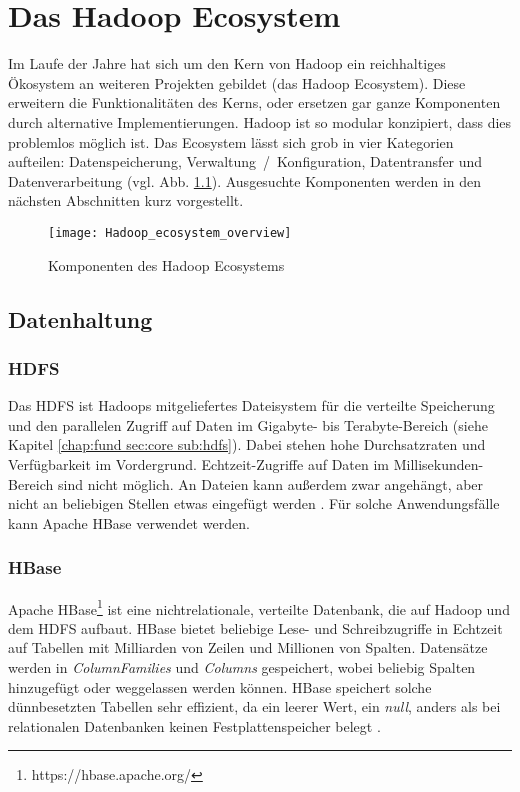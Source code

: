 \chapter{Das Hadoop Ecosystem}
Im Laufe der Jahre hat sich um den Kern von Hadoop ein reichhaltiges Ökosystem an weiteren Projekten gebildet (das Hadoop Ecosystem). Diese erweitern die Funktionalitäten des Kerns, oder ersetzen gar ganze Komponenten durch alternative Implementierungen. Hadoop ist so modular konzipiert, dass dies problemlos möglich ist. Das Ecosystem lässt sich grob in vier Kategorien aufteilen: Datenspeicherung, Verwaltung~/~Konfiguration, Datentransfer und Datenverarbeitung (vgl. Abb. \ref{fig:ecosys}). Ausgesuchte Komponenten werden in den nächsten Abschnitten kurz vorgestellt.

\begin{figure}[ht]
    \centering
    \texttt{[image: Hadoop\_ecosystem\_overview]}
    \caption[Komponenten des Hadoop Ecosystems]{Komponenten des Hadoop Ecosystems\parencite{van_der_weel_hadoop_2015}}
    \label{fig:ecosys}
\end{figure}

\section{Datenhaltung}
\subsection{HDFS}
Das HDFS ist Hadoops mitgeliefertes Dateisystem für die verteilte Speicherung und den parallelen Zugriff auf Daten im Gigabyte- bis Terabyte-Bereich (siehe Kapitel \ref{chap:fund sec:core sub:hdfs}). Dabei stehen hohe Durchsatzraten und Verfügbarkeit im Vordergrund. Echtzeit-Zugriffe auf Daten im Millisekunden-Bereich sind nicht möglich. An Dateien kann außerdem zwar angehängt, aber nicht an beliebigen Stellen etwas eingefügt werden \parencite[vgl.][Kapitel 3]{white_hadoop_2015}. Für solche Anwendungsfälle kann Apache HBase verwendet werden. 
\subsection{HBase}
Apache HBase\footnote{https://hbase.apache.org/} ist eine nichtrelationale, verteilte Datenbank, die auf Hadoop und dem HDFS aufbaut. HBase bietet beliebige Lese- und Schreibzugriffe in Echtzeit auf Tabellen mit Milliarden von Zeilen und Millionen von Spalten. Datensätze werden in \textit{ColumnFamilies} und \textit{Columns} gespeichert, wobei beliebig Spalten hinzugefügt oder weggelassen werden können. HBase speichert solche dünnbesetzten Tabellen sehr effizient, da ein leerer Wert, ein \textit{null}, anders als bei relationalen Datenbanken keinen Festplattenspeicher belegt \parencite[vgl.][Abschnitt 21]{hbase_team_apache_2022}.  

